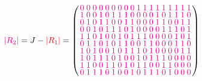 \documentclass{beamer}
\newcommand{\rred}[1]{\textcolor{red}{#1}}
\newcommand{\mmag}[1]{\textcolor{magenta}{#1}}
\newcommand{\abs}[1]{|#1|}
\begin{document}
\begin{frame}

  \[
    \mmag{\abs{R_2}} = J-\rred{\abs{R_1}} =
    \left(
      \arraycolsep=1.25pt\def\arraystretch{0.625}
      \begin{array}{cccccccccccccccccc}
        \mmag{0}&\mmag{0}&\mmag{0}&\mmag{0}&\mmag{0}&\mmag{0}&\mmag{0}&\mmag{0}&\mmag{0}&\mmag{1}&\mmag{1}&\mmag{1}&\mmag{1}&\mmag{1}&\mmag{1}&\mmag{1}&\mmag{1}&\mmag{1}\\
        \mmag{1}&\mmag{0}&\mmag{0}&\mmag{1}&\mmag{0}&\mmag{1}&\mmag{1}&\mmag{1}&\mmag{0}&\mmag{0}&\mmag{0}&\mmag{0}&\mmag{1}&\mmag{0}&\mmag{1}&\mmag{1}&\mmag{1}&\mmag{0}\\
        \mmag{0}&\mmag{1}&\mmag{0}&\mmag{1}&\mmag{1}&\mmag{0}&\mmag{0}&\mmag{1}&\mmag{1}&\mmag{0}&\mmag{0}&\mmag{0}&\mmag{1}&\mmag{1}&\mmag{0}&\mmag{0}&\mmag{1}&\mmag{1}\\
        \mmag{0}&\mmag{0}&\mmag{1}&\mmag{0}&\mmag{1}&\mmag{1}&\mmag{1}&\mmag{0}&\mmag{1}&\mmag{0}&\mmag{0}&\mmag{0}&\mmag{0}&\mmag{1}&\mmag{1}&\mmag{1}&\mmag{0}&\mmag{1}\\
        \mmag{1}&\mmag{1}&\mmag{0}&\mmag{1}&\mmag{0}&\mmag{0}&\mmag{1}&\mmag{0}&\mmag{1}&\mmag{1}&\mmag{1}&\mmag{0}&\mmag{0}&\mmag{0}&\mmag{0}&\mmag{1}&\mmag{0}&\mmag{1}\\
        \mmag{0}&\mmag{1}&\mmag{1}&\mmag{0}&\mmag{1}&\mmag{0}&\mmag{1}&\mmag{1}&\mmag{0}&\mmag{0}&\mmag{1}&\mmag{1}&\mmag{0}&\mmag{0}&\mmag{0}&\mmag{1}&\mmag{1}&\mmag{0}\\
        \mmag{1}&\mmag{0}&\mmag{1}&\mmag{0}&\mmag{0}&\mmag{1}&\mmag{0}&\mmag{1}&\mmag{1}&\mmag{1}&\mmag{0}&\mmag{1}&\mmag{0}&\mmag{0}&\mmag{0}&\mmag{0}&\mmag{1}&\mmag{1}\\
        \mmag{1}&\mmag{0}&\mmag{1}&\mmag{1}&\mmag{1}&\mmag{0}&\mmag{1}&\mmag{0}&\mmag{0}&\mmag{1}&\mmag{0}&\mmag{1}&\mmag{1}&\mmag{1}&\mmag{0}&\mmag{0}&\mmag{0}&\mmag{0}\\
        \mmag{1}&\mmag{1}&\mmag{0}&\mmag{0}&\mmag{1}&\mmag{1}&\mmag{0}&\mmag{1}&\mmag{0}&\mmag{1}&\mmag{1}&\mmag{0}&\mmag{0}&\mmag{1}&\mmag{1}&\mmag{0}&\mmag{0}&\mmag{0}\\
        \mmag{0}&\mmag{1}&\mmag{1}&\mmag{1}&\mmag{0}&\mmag{1}&\mmag{0}&\mmag{0}&\mmag{1}&\mmag{0}&\mmag{1}&\mmag{1}&\mmag{1}&\mmag{0}&\mmag{1}&\mmag{0}&\mmag{0}&\mmag{0}\\
      \end{array}
    \right)
  \]
  
\end{frame}
\end{document}
